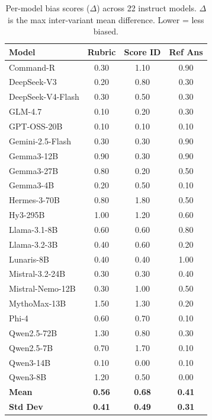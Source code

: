 \begin{table}[h]
\centering\small
\caption{Per-model bias scores ($\Delta$) across 22 instruct models.
$\Delta$ is the max inter-variant mean difference. Lower = less biased.}
\label{tab:per_model}
\begin{tabular}{lccc}
\toprule
\textbf{Model} & \textbf{Rubric} & \textbf{Score ID} & \textbf{Ref Ans} \\
\midrule
Command-R & 0.30 & 1.10 & 0.90 \\
DeepSeek-V3 & 0.20 & 0.80 & 0.30 \\
DeepSeek-V4-Flash & 0.30 & 0.50 & 0.30 \\
GLM-4.7 & 0.10 & 0.20 & 0.30 \\
GPT-OSS-20B & 0.10 & 0.10 & 0.10 \\
Gemini-2.5-Flash & 0.30 & 0.30 & 0.90 \\
Gemma3-12B & 0.90 & 0.30 & 0.90 \\
Gemma3-27B & 0.80 & 0.20 & 0.50 \\
Gemma3-4B & 0.20 & 0.50 & 0.10 \\
Hermes-3-70B & 0.80 & 1.80 & 0.50 \\
Hy3-295B & 1.00 & 1.20 & 0.60 \\
Llama-3.1-8B & 0.60 & 0.60 & 0.80 \\
Llama-3.2-3B & 0.40 & 0.60 & 0.20 \\
Lunaris-8B & 0.40 & 0.40 & 1.00 \\
Mistral-3.2-24B & 0.30 & 0.30 & 0.40 \\
Mistral-Nemo-12B & 0.30 & 1.00 & 0.50 \\
MythoMax-13B & 1.50 & 1.30 & 0.20 \\
Phi-4 & 0.60 & 0.70 & 0.10 \\
Qwen2.5-72B & 1.30 & 0.80 & 0.30 \\
Qwen2.5-7B & 0.70 & 1.70 & 0.10 \\
Qwen3-14B & 0.10 & 0.00 & 0.10 \\
Qwen3-8B & 1.20 & 0.50 & 0.00 \\
\midrule
\textbf{Mean} & \textbf{0.56} & \textbf{0.68} & \textbf{0.41} \\
\textbf{Std Dev} & \textbf{0.41} & \textbf{0.49} & \textbf{0.31} \\
\bottomrule
\end{tabular}
\end{table}
